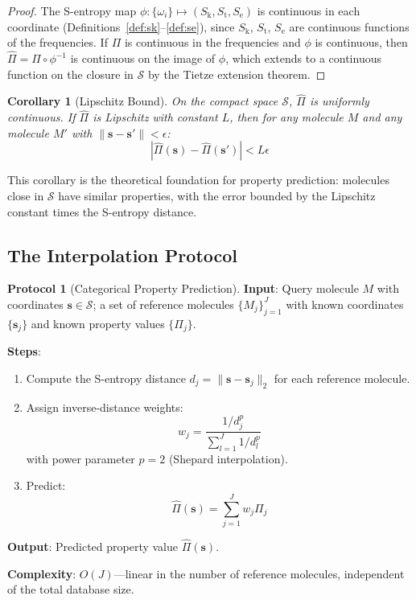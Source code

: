 \documentclass[11pt,twocolumn,a4paper]{article}
\newtheorem{corollary}[theorem]{Corollary}
\theoremstyle{definition}
\newtheorem{protocol}[theorem]{Protocol}
\theoremstyle{remark}
\newcommand{\Sk}{S_{\mathrm{k}}}
\newcommand{\St}{S_{\mathrm{t}}}
\newcommand{\Se}{S_{\mathrm{e}}}
\newcommand{\Sspace}{\mathcal{S}}
\begin{document}
\begin{proof}
The S-entropy map $\phi: \{\omega_i\} \mapsto (\Sk, \St, \Se)$ is continuous in each coordinate (Definitions~\ref{def:sk}--\ref{def:se}), since $\Sk$, $\St$, $\Se$ are continuous functions of the frequencies. If $\Pi$ is continuous in the frequencies and $\phi$ is continuous, then $\hat{\Pi} = \Pi \circ \phi^{-1}$ is continuous on the image of $\phi$, which extends to a continuous function on the closure in $\Sspace$ by the Tietze extension theorem.
\end{proof}

\begin{corollary}[Lipschitz Bound]
\label{cor:lipschitz}
On the compact space $\Sspace$, $\hat{\Pi}$ is uniformly continuous. If $\hat{\Pi}$ is Lipschitz with constant $L$, then for any molecule $M$ and any molecule $M'$ with $\|\mathbf{s} - \mathbf{s}'\| < \epsilon$:
\begin{equation}
|\hat{\Pi}(\mathbf{s}) - \hat{\Pi}(\mathbf{s}')| < L \epsilon
\label{eq:lipschitz}
\end{equation}
\end{corollary}

This corollary is the theoretical foundation for property prediction: molecules close in $\Sspace$ have similar properties, with the error bounded by the Lipschitz constant times the S-entropy distance.

\subsection{The Interpolation Protocol}

\begin{protocol}[Categorical Property Prediction]
\label{prot:property}
\textbf{Input}: Query molecule $M$ with coordinates $\mathbf{s} \in \Sspace$; a set of reference molecules $\{M_j\}_{j=1}^{J}$ with known coordinates $\{\mathbf{s}_j\}$ and known property values $\{\Pi_j\}$.

\textbf{Steps}:
\begin{enumerate}[nosep]
\item Compute the S-entropy distance $d_j = \|\mathbf{s} - \mathbf{s}_j\|_2$ for each reference molecule.
\item Assign inverse-distance weights:
\begin{equation}
w_j = \frac{1/d_j^p}{\sum_{l=1}^J 1/d_l^p}
\label{eq:idw_weights}
\end{equation}
with power parameter $p = 2$ (Shepard interpolation).
\item Predict:
\begin{equation}
\hat{\Pi}(\mathbf{s}) = \sum_{j=1}^{J} w_j \Pi_j
\label{eq:prediction}
\end{equation}
\end{enumerate}

\textbf{Output}: Predicted property value $\hat{\Pi}(\mathbf{s})$.

\textbf{Complexity}: $O(J)$---linear in the number of reference molecules, independent of the total database size.
\end{protocol}
\end{document}
